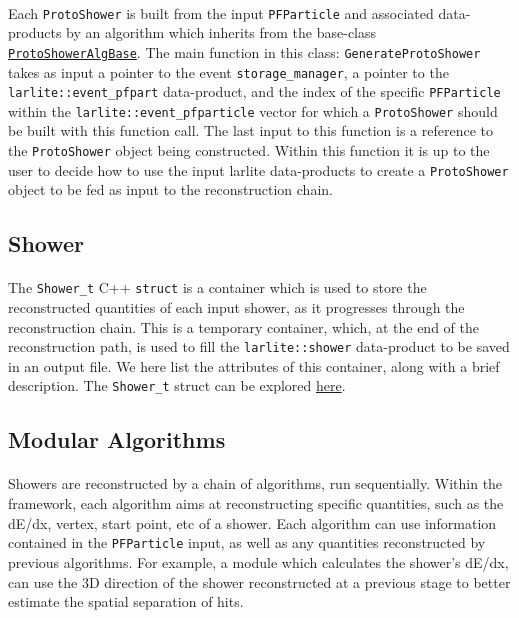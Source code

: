 \paragraph{}Each \texttt{ProtoShower} is built from the input \texttt{PFParticle} and associated data-products by an algorithm which inherits from the base-class \href{https://github.com/larlight/larlite/blob/trunk/UserDev/RecoTool/ShowerReco3D/ProtoShower/ProtoShowerAlgBase.h}{\texttt{ProtoShowerAlgBase}}. The main function in this class: \texttt{GenerateProtoShower} takes as input a pointer to the event \texttt{storage\_manager}, a pointer to the \texttt{larlite::event\_pfpart} data-product, and the index of the specific \texttt{PFParticle} within the \texttt{larlite::event\_pfparticle} vector for which a \texttt{ProtoShower} should be built with this function call. The last input to this function is a reference to the \texttt{ProtoShower} object being constructed. Within this function it is up to the user to decide how to use the input larlite data-products to create a \texttt{ProtoShower} object to be fed as input to the reconstruction chain.

\subsection{Shower}
\paragraph{}The \texttt{Shower\_t} C++ \texttt{struct} is a container which is used to store the reconstructed quantities of each input shower, as it progresses through the reconstruction chain. This is a temporary container, which, at the end of the reconstruction path, is used to fill the \texttt{larlite::shower} data-product to be saved in an output file. We here list the attributes of this container, along with a brief description. The \texttt{Shower\_t} struct can be explored \href{https://github.com/larlight/larlite/blob/trunk/UserDev/RecoTool/ShowerReco3D/Base/ShowerRecoTypes.h}{here}.


\subsection{Modular Algorithms}
\paragraph{}Showers are reconstructed by a chain of algorithms, run sequentially. Within the framework, each algorithm aims at reconstructing specific quantities, such as the dE/dx, vertex, start point, etc of a shower. Each algorithm can use information contained in the \texttt{PFParticle} input, as well as any quantities reconstructed by previous algorithms. For example, a module which calculates the shower's dE/dx, can use the 3D direction of the shower reconstructed at a previous stage to better estimate the spatial separation of hits.
